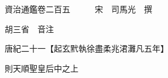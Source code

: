 










 


 
 


 

  
  
  
  
  





  
  
  
  
  
 
  

  

  
  
  



  

 
 

  
   




  

  
  


  　　資治通鑑卷二百五　　　宋　司馬光　撰

　　胡三省　音注

　　唐紀二十一【起玄黓執徐盡柔兆涒灘凡五年】

　　則天順聖皇后中之上

